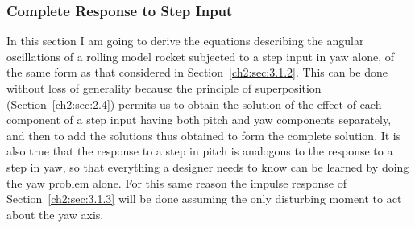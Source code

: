 \subsubsection{Complete Response to Step Input}\label{ch2:sec:3.2.2}

In this section I am going to derive the equations describing the angular
oscillations of a rolling model rocket subjected to a step input in yaw alone,
of the same form as that considered in Section~\ref{ch2:sec:3.1.2}. This can be
done without loss of generality because the principle of superposition
(Section~\ref{ch2:sec:2.4}) permits us to obtain the solution of the effect of
each component of a step input having both pitch and yaw components separately,
and then to add the solutions thus obtained to form the complete solution. It
is also true that the response to a step in pitch is analogous to the response
to a step in yaw, so that everything a designer needs to know can be learned by
doing the yaw problem alone. For this same reason the impulse response of
Section~\ref{ch2:sec:3.1.3} will be done assuming the only disturbing moment to
act about the yaw axis.

